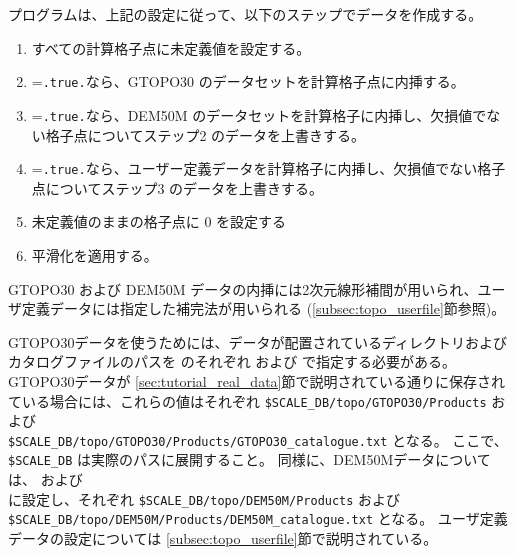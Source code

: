 プログラムは、上記の設定に従って、以下のステップでデータを作成する。
\begin{enumerate}[1)]
 \item すべての計算格子点に未定義値を設定する。
 \item {}=\verb|.true.|なら、GTOPO30 のデータセットを計算格子点に内挿する。
 \item {}=\verb|.true.|なら、DEM50M のデータセットを計算格子に内挿し、欠損値でない格子点についてステップ2 のデータを上書きする。
 \item {}=\verb|.true.|なら、ユーザー定義データを計算格子に内挿し、欠損値でない格子点についてステップ3 のデータを上書きする。
 \item 未定義値のままの格子点に 0 を設定する
 \item 平滑化を適用する。
\end{enumerate}
GTOPO30 および DEM50M データの内挿には2次元線形補間が用いられ、ユーザ定義データには指定した補完法が用いられる (\ref{subsec:topo_userfile}節参照)。

GTOPO30データを使うためには、データが配置されているディレクトリおよびカタログファイルのパスを  のそれぞれ  および  で指定する必要がある。
GTOPO30データが \ref{sec:tutorial_real_data}節で説明されている通りに保存されている場合には、これらの値はそれぞれ \verb|$SCALE_DB/topo/GTOPO30/Products| および \\ \verb|$SCALE_DB/topo/GTOPO30/Products/GTOPO30_catalogue.txt| となる。
ここで、\verb|$SCALE_DB| は実際のパスに展開すること。
同様に、DEM50Mデータについては、 および \\  に設定し、それぞれ \verb|$SCALE_DB/topo/DEM50M/Products| および \\ \verb|$SCALE_DB/topo/DEM50M/Products/DEM50M_catalogue.txt| となる。
ユーザ定義データの設定については \ref{subsec:topo_userfile}節で説明されている。


